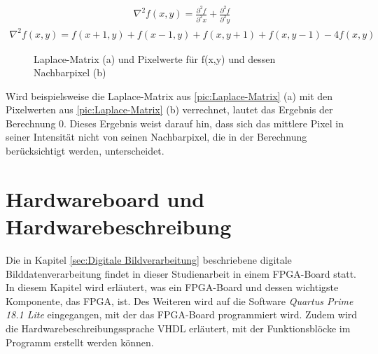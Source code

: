 \documentclass[ngerman,12pt]{article} %
\begin{document}
\begin{align}
	\label{eq:Laplace-Operation-1}
	\nabla^2{f(x,y)} = \frac{\partial^2{f}} {\partial^2{x}} +  \frac{\partial^2{f}} {\partial^2{y}}
\end{align}
\begin{align}
	\label{eq:Laplace-Operation-2}
	\nabla^2{f(x,y)} = f(x+1,y) + f(x-1,y) + f(x,y+1) + f(x,y-1) - 4 f(x,y)
\end{align}

\begin{figure}[H]
  \centering
  \qquad
  \caption[Laplace-Matrix]{\label{pic:Laplace-Matrix}Laplace-Matrix (a) und Pixelwerte für f(x,y) und dessen Nachbarpixel (b)}
\end{figure}

Wird beispielsweise die Laplace-Matrix aus \autoref{pic:Laplace-Matrix} (a) mit den Pixelwerten aus \autoref{pic:Laplace-Matrix} (b) verrechnet, lautet das Ergebnis der Berechnung 0. Dieses Ergebnis weist darauf hin, dass sich das mittlere Pixel in seiner Intensität nicht von seinen Nachbarpixel, die in der Berechnung berücksichtigt werden, unterscheidet.
\clearpage





\section{Hardwareboard und Hardwarebeschreibung}
\label{sec:FPGA-Board und Hardwarebeschreibung}
Die in Kapitel \ref{sec:Digitale Bildverarbeitung} beschriebene digitale Bilddatenverarbeitung findet in dieser Studienarbeit in einem FPGA-Board statt. In diesem Kapitel wird erläutert, was ein FPGA-Board und dessen wichtigste Komponente, das FPGA, ist. Des Weiteren wird auf die Software \textit{Quartus Prime 18.1 Lite} eingegangen, mit der das FPGA-Board programmiert wird. Zudem wird die Hardwarebeschreibungssprache VHDL erläutert, mit der Funktionsblöcke im Programm erstellt werden können.  
\end{document}
